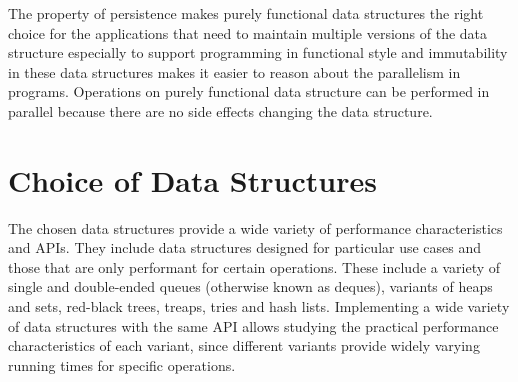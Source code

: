 The property of persistence makes purely functional data structures the
right choice for the applications that need to maintain multiple
versions of the data structure especially to support programming in
functional style and immutability in these data structures makes it
easier to reason about the parallelism in programs. Operations on purely
functional data structure can be performed in parallel because there are
no side effects changing the data structure.






\section{Choice of Data Structures}

The chosen data structures provide a wide variety of performance
characteristics and APIs. They include data structures designed for
particular use cases and those that are only performant for certain
operations. These include a variety of single and double-ended queues
(otherwise known as deques), variants of heaps and sets, red-black
trees, treaps, tries and hash lists. Implementing a wide variety of data
structures with the same API allows studying the practical performance
characteristics of each variant, since different variants provide widely
varying running times for specific operations.


